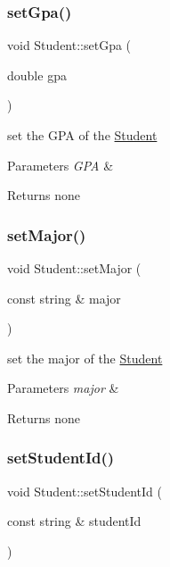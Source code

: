\subsubsection{\texorpdfstring{set\+Gpa()}{setGpa()}}
{\footnotesize\ttfamily void Student\+::set\+Gpa (\begin{DoxyParamCaption}\item[{double}]{gpa }\end{DoxyParamCaption})\hspace{0.3cm}{\ttfamily [inline]}}

set the G\+PA of the \hyperlink{classStudent}{Student}


\begin{DoxyParams}{Parameters}
{\em G\+PA} & \\
\hline
\end{DoxyParams}
\begin{DoxyReturn}{Returns}
none 
\end{DoxyReturn}
\mbox{\label{classStudent_a5cbba70491e876fe9410e1c6dce3064e}} 
\subsubsection{\texorpdfstring{set\+Major()}{setMajor()}}
{\footnotesize\ttfamily void Student\+::set\+Major (\begin{DoxyParamCaption}\item[{const string \&}]{major }\end{DoxyParamCaption})\hspace{0.3cm}{\ttfamily [inline]}}

set the major of the \hyperlink{classStudent}{Student}


\begin{DoxyParams}{Parameters}
{\em major} & \\
\hline
\end{DoxyParams}
\begin{DoxyReturn}{Returns}
none 
\end{DoxyReturn}
\mbox{\label{classStudent_ad25e6194b5a4b23a31c9be9ea1918667}} 
\subsubsection{\texorpdfstring{set\+Student\+Id()}{setStudentId()}}
{\footnotesize\ttfamily void Student\+::set\+Student\+Id (\begin{DoxyParamCaption}\item[{const string \&}]{student\+Id }\end{DoxyParamCaption})\hspace{0.3cm}{\ttfamily [inline]}}

